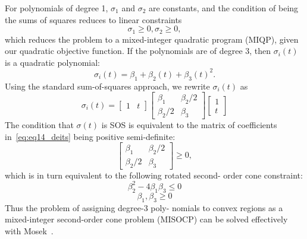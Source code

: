 For polynomials of degree 1, $\sigma_{1}$ and $\sigma_{2}$ are constants, and
the condition of being the sums of squares reduces to linear constraints\begin{equation} \label{eq:eq12_deits}
\sigma_{1} \geq 0, \sigma_{2} \geq 0,
\end{equation} which reduces the problem to a mixed-integer quadratic
program (MIQP), given our quadratic objective function.
If the polynomials are of degree 3, then $\sigma_{i}(t)$ is a quadratic
polynomial:\begin{equation} \label{eq:eq13_deits}
\sigma_{i}(t) = \beta_{1} + \beta_{2}(t) + \beta_{3}(t)^2.
\end{equation}
Using the standard sum-of-squares approach, we rewrite
$\sigma_{i}(t)$ as\begin{equation} \label{eq:eq14_deits}
\sigma_{i}(t) = \begin{bmatrix}1
& t
\end{bmatrix} \begin{bmatrix}\beta_{1}
& \beta_{2}/2\\ \beta_{2}/2 
& \beta_{3}
\end{bmatrix} \begin{bmatrix}1
\\ t
\end{bmatrix}
\end{equation}
The condition that $\sigma(t)$ is SOS is equivalent to the matrix
of coefficients in~\ref{eq:eq14_deits} being positive semi-definite:\begin{equation} \label{eq:eq15_deits}
\begin{bmatrix}\beta_{1}
& \beta_{2}/2\\ \beta_{2}/2 
& \beta_{3}
\end{bmatrix} \geq 0,
\end{equation}which is in turn equivalent to the following rotated second-
order cone constraint:
\begin{equation} \label{eq:eq16_deits}
\beta_{2}^2 - 4\beta_{1}\beta_{3} \leq 0
\end{equation}\begin{equation} \label{eq:eq17_deits}
\beta_{1}, \beta_{3} \geq 0
\end{equation}Thus the problem of assigning degree-3 poly-
nomials to convex regions as a mixed-integer second-order
cone problem (MISOCP) can be solved effectively
with Mosek~\cite{aps2014mosek}.

